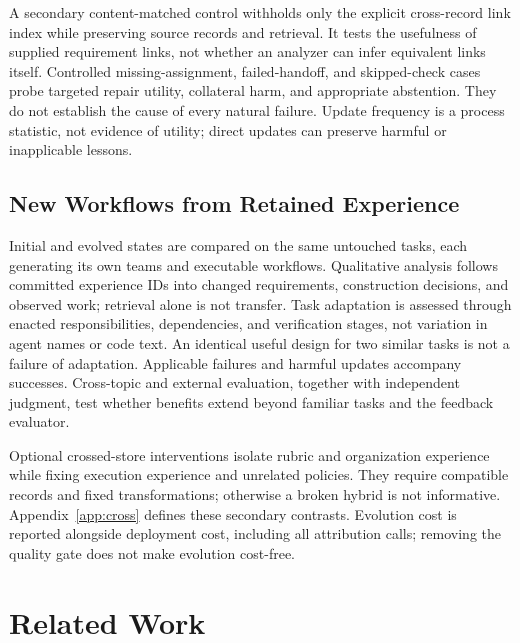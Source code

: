 \documentclass[11pt]{article}
\begin{document}
A secondary content-matched control withholds only the explicit cross-record link index while preserving source records and retrieval. It tests the usefulness of supplied requirement links, not whether an analyzer can infer equivalent links itself. Controlled missing-assignment, failed-handoff, and skipped-check cases probe targeted repair utility, collateral harm, and appropriate abstention. They do not establish the cause of every natural failure. Update frequency is a process statistic, not evidence of utility; direct updates can preserve harmful or inapplicable lessons.

\subsection{New Workflows from Retained Experience}
\label{sec:transfer}

Initial and evolved states are compared on the same untouched tasks, each generating its own teams and executable workflows. Qualitative analysis follows committed experience IDs into changed requirements, construction decisions, and observed work; retrieval alone is not transfer. Task adaptation is assessed through enacted responsibilities, dependencies, and verification stages, not variation in agent names or code text. An identical useful design for two similar tasks is not a failure of adaptation. Applicable failures and harmful updates accompany successes. Cross-topic and external evaluation, together with independent judgment, test whether benefits extend beyond familiar tasks and the feedback evaluator.

Optional crossed-store interventions isolate rubric and organization experience while fixing execution experience and unrelated policies. They require compatible records and fixed transformations; otherwise a broken hybrid is not informative. Appendix~\ref{app:cross} defines these secondary contrasts. Evolution cost is reported alongside deployment cost, including all attribution calls; removing the quality gate does not make evolution cost-free.

\section{Related Work}
\label{sec:related}
\end{document}
